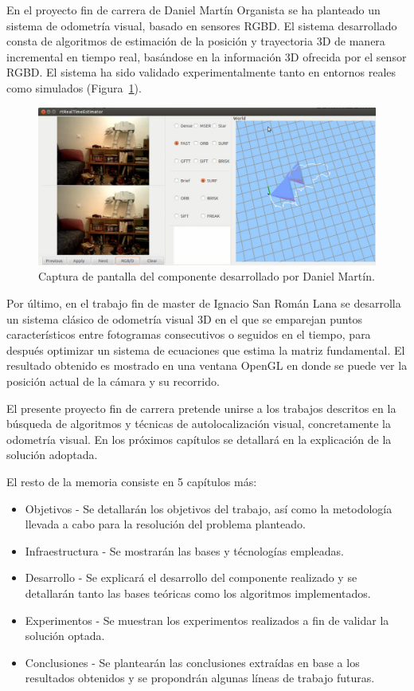 \newpage

En el proyecto fin de carrera de Daniel Martín Organista \parencite{ref5} se ha planteado un sistema de odometría visual, basado en sensores RGBD. El sistema desarrollado consta de algoritmos de estimación de la posición y trayectoria 3D de manera incremental en tiempo real, basándose en la información 3D ofrecida por el sensor RGBD. El sistema ha sido validado experimentalmente tanto en entornos reales como simulados (Figura~\ref{fig:dani}).

\begin{figure}[th]
\centering
\includegraphics[scale=0.2]{Figures/cap-dani.png}
\decoRule
\caption[Captura de pantalla, PFC de Daniel Martín]{Captura de pantalla del componente desarrollado por Daniel Martín.}
\label{fig:dani}
\end{figure}

Por último, en el trabajo fin de master de Ignacio San Román Lana \parencite{ref4} se desarrolla un sistema clásico de odometría visual 3D en el que se emparejan puntos característicos entre fotogramas consecutivos o seguidos en el tiempo, para después optimizar un sistema de ecuaciones que estima la matriz fundamental. El resultado obtenido es mostrado en una ventana OpenGL en donde se puede ver la posición actual de la cámara y su recorrido.

El presente proyecto fin de carrera pretende unirse a los trabajos descritos en la búsqueda de algoritmos y técnicas de autolocalización visual, concretamente la odometría visual. En los próximos capítulos se detallará en la explicación de la solución adoptada.

El resto de la memoria consiste en 5 capítulos más:
\begin{itemize}
\item Objetivos - Se detallarán los objetivos del trabajo, así como la metodología llevada a cabo para la resolución del problema planteado.
\item Infraestructura - Se mostrarán las bases y técnologías empleadas.
\item Desarrollo - Se explicará el desarrollo del componente realizado y se detallarán tanto las bases teóricas como los algoritmos implementados.
\item Experimentos - Se muestran los experimentos realizados a fin de validar la solución optada.
\item Conclusiones - Se plantearán las conclusiones extraídas en base a los resultados obtenidos y se propondrán algunas líneas de trabajo futuras.

\end{itemize}